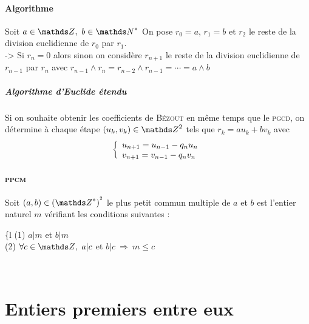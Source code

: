 		\paragraph{Algorithme}\label{AlgoEuclid}
			Soit $a\in\Z,~b\in\N^*$ On pose $r_0=a$, $r_1=b$ et $r_2$ le reste de la division euclidienne de $r_0$ par $r_1$.\\
			-> Si $r_n=0$ alors  sinon on considère $r_{n+1}$ le reste de la division euclidienne de $r_{n-1}$ par 
			$r_n$ avec $r_{n-1}\wedge r_n = r_{n-2}\wedge r_{n-1} = \cdots = a\wedge b$
		\subparagraph{Algorithme d'Euclide étendu} ${}$\\
		Si on souhaite obtenir les coefficients de \textsc{Bézout} en même temps que le \textsc{pgcd}, on détermine à chaque étape $(u_k,v_k) 
		\in\Z^2$ tels que $r_k=au_k+bv_k$ avec \[ \left\{ \begin{array}{l} u_{n+1} = u_{n-1}-q_nu_n \\ v_{n+1} = v_{n-1} - q_nv_n \end{array} \right. \]
		\traitd 
		\paragraph{\textsc{ppcm}} Soit $(a,b)\in (\Z^*)^{^2}$ le plus petit commun multiple de $a$ et $b$ est l'entier naturel $m$ vérifiant les 
			conditions suivantes : \begin{blockarray}[t]{\{l} {\tiny (1)} $a|m$ et $b|m$ \\ {\tiny (2)} $\forall c\in\Z ,~a|c$ et $b|c ~\Rightarrow 
			~m\leq c$ \end{blockarray} \trait
		\vspace*{0.5cm} \\ 
	\section{Entiers premiers entre eux}
		\traitd

